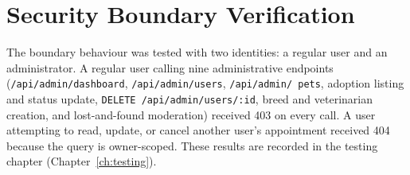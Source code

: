 \section{Security Boundary Verification}

The boundary behaviour was tested with two identities: a regular user and an
administrator. A regular user calling nine administrative endpoints
(\texttt{/api/admin/dashboard}, \texttt{/api/admin/users}, \texttt{/api/admin/
pets}, adoption listing and status update, \texttt{DELETE /api/admin/users/:id},
breed and veterinarian creation, and lost-and-found moderation) received 403 on
every call. A user attempting to read, update, or cancel another user's
appointment received 404 because the query is owner-scoped. These results are
recorded in the testing chapter (Chapter~\ref{ch:testing}).